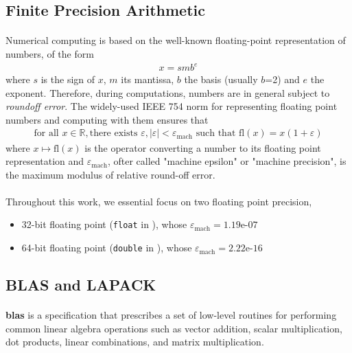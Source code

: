 \subsection{Finite Precision Arithmetic}
\paragraph*{}
Numerical computing is based on the well-known floating-point representation of numbers,
of the form
\begin{align*}
    x=smb^e
\end{align*}
where $s$ is the sign of $x$, $m$ its mantissa, $b$ the basis (usually $b$=2) and $e$ the exponent. Therefore, during computations, numbers are in general subject to \textit{roundoff error}.
The widely-used IEEE 754 \cite{ieee-754} norm for representing floating point numbers and computing with them ensures that
\begin{align*}
    \text{for all } x \in \mathbb{R}, \text{there exists } \varepsilon, \lvert \varepsilon \rvert < \varepsilon_{\text{mach}} \text{  such that } \text{fl}(x) = x(1+\varepsilon)
\end{align*}
where $x \mapsto \text{fl}(x)$ is the operator converting a number to its floating point representation and $\varepsilon_{\text{mach}}$, ofter called "machine epsilon" or "machine precision", is the maximum modulus of relative round-off error.

\paragraph*{}
Throughout this work, we essential focus on two floating point precision,
\begin{itemize}
    \item 32-bit floating point (\texttt{float} in \CC), whose $\varepsilon_{\text{mach}} = 1.19\text{e-}07$
    \item 64-bit floating point (\texttt{double} in \CC), whose $\varepsilon_{\text{mach}} = 2.22\text{e-}16$
\end{itemize}


\subsection{BLAS and LAPACK}
\paragraph*{}
\textbf{\acrfull{blas}} \cite{blas} is a specification that prescribes a set of low-level routines for performing common linear algebra operations such as vector addition, scalar multiplication, dot products, linear combinations, and matrix multiplication.

